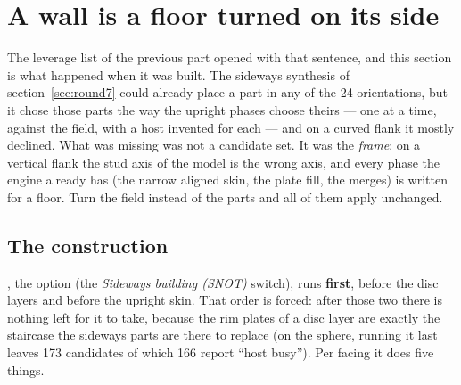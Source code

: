 \section{A wall is a floor turned on its side}\label{sec:wall}
The leverage list of the previous part opened with that sentence, and this section is what happened when it was built. The
sideways synthesis of section~\ref{sec:round7} could already place a part in any of the 24 orientations, but it chose those parts
the way the upright phases choose theirs --- one at a time, against the field, with a host invented for each --- and on a curved
flank it mostly declined. What was missing was not a candidate set. It was the \emph{frame}: on a vertical flank the stud axis of
the model is the wrong axis, and every phase the engine already has (the narrow aligned skin, the plate fill, the merges) is
written for a floor. Turn the field instead of the parts and all of them apply unchanged.

\subsection{The construction}
, the option  (the \emph{Sideways building (SNOT)} switch), runs \textbf{first}, before the disc
layers and before the upright skin. That order is forced: after those two there is nothing left for it to take, because the rim
plates of a disc layer are exactly the staircase the sideways parts are there to replace (on the sphere, running it last leaves
173 candidates of which 166 report ``host busy''). Per facing it does five things.

